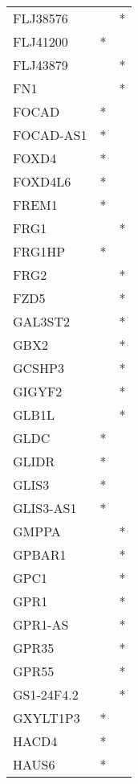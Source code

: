 \begin{longtable}{lcc}
FLJ38576       &           &       * \\
FLJ41200       &         * &         \\
FLJ43879       &           &       * \\
FN1            &           &       * \\
FOCAD          &         * &         \\
FOCAD-AS1      &         * &         \\
FOXD4          &         * &         \\
FOXD4L6        &         * &         \\
FREM1          &         * &         \\
FRG1           &           &       * \\
FRG1HP         &         * &         \\
FRG2           &           &       * \\
FZD5           &           &       * \\
GAL3ST2        &           &       * \\
GBX2           &           &       * \\
GCSHP3         &           &       * \\
GIGYF2         &           &       * \\
GLB1L          &           &       * \\
GLDC           &         * &         \\
GLIDR          &         * &         \\
GLIS3          &         * &         \\
GLIS3-AS1      &         * &         \\
GMPPA          &           &       * \\
GPBAR1         &           &       * \\
GPC1           &           &       * \\
GPR1           &           &       * \\
GPR1-AS        &           &       * \\
GPR35          &           &       * \\
GPR55          &           &       * \\
GS1-24F4.2     &           &       * \\
GXYLT1P3       &         * &         \\
HACD4          &         * &         \\
HAUS6          &         * &         \\

\end{longtable}
